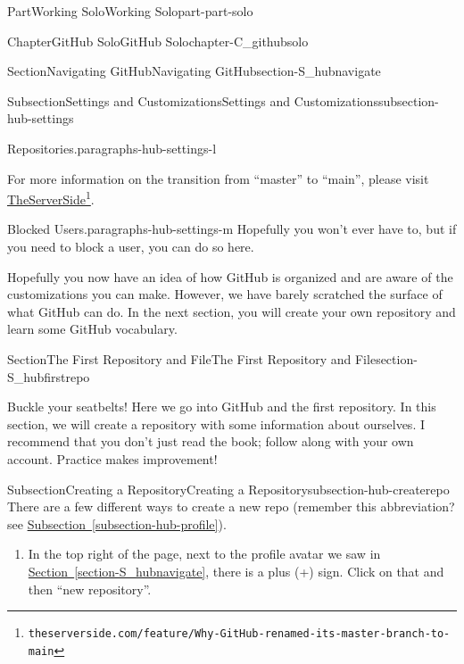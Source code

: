 \documentclass[oneside,10pt,]{book}
\newcommand{\xreffont}{\relax}
\begin{document}
\begin{partptx}{Part}{Working Solo}{}{Working Solo}{}{}{part-part-solo}
\begin{chapterptx}{Chapter}{GitHub Solo}{}{GitHub Solo}{}{}{chapter-C_githubsolo}
\begin{sectionptx}{Section}{Navigating GitHub}{}{Navigating GitHub}{}{}{section-S_hubnavigate}
\begin{subsectionptx}{Subsection}{Settings and Customizations}{}{Settings and Customizations}{}{}{subsection-hub-settings}
\begin{paragraphs}{Repositories.}{paragraphs-hub-settings-l}
\par
For more information on the transition from ``master'' to ``main'', please visit \href{https://www.theserverside.com/feature/Why-GitHub-renamed-its-master-branch-to-main}{TheServerSide}\footnote{\nolinkurl{theserverside.com/feature/Why-GitHub-renamed-its-master-branch-to-main}\label{fn-hub-settings-l-e-d}}.%
\end{paragraphs}%
\begin{paragraphs}{Blocked Users.}{paragraphs-hub-settings-m}%
%
Hopefully you won't ever have to, but if you need to block a user, you can do so here.%
\end{paragraphs}%
\end{subsectionptx}
\begin{conclusion}{}%
Hopefully you now have an idea of how GitHub is organized and are aware of the customizations you can make. However, we have barely scratched the surface of what GitHub can do. In the next section, you will create your own repository and learn some GitHub vocabulary.%
\end{conclusion}%
\end{sectionptx}
%
%
\typeout{************************************************}
\typeout{************************************************}
%
\begin{sectionptx}{Section}{The First Repository and File}{}{The First Repository and File}{}{}{section-S_hubfirstrepo}
%
%
\begin{introduction}{}%
Buckle your seatbelts! Here we go into GitHub and the first repository. In this section, we will create a repository with some information about ourselves. I recommend that you don't just read the book; follow along with your own account. Practice makes improvement!%
\end{introduction}%
%
%
\typeout{************************************************}
\typeout{************************************************}
%
\begin{subsectionptx}{Subsection}{Creating a Repository}{}{Creating a Repository}{}{}{subsection-hub-createrepo}
%
There are a few different ways to create a new repo (remember this abbreviation? see \hyperref[subsection-hub-profile]{Subsection~{\xreffont\ref{subsection-hub-profile}}}).%
\begin{enumerate}
\item{}In the top right of the page, next to the profile avatar we saw in \hyperref[section-S_hubnavigate]{Section~{\xreffont\ref{section-S_hubnavigate}}}, there is a plus (+) sign. Click on that and then ``new repository''.%

\end{enumerate}
\end{subsectionptx}
\end{sectionptx}
\end{chapterptx}
\end{partptx}
\end{document}
